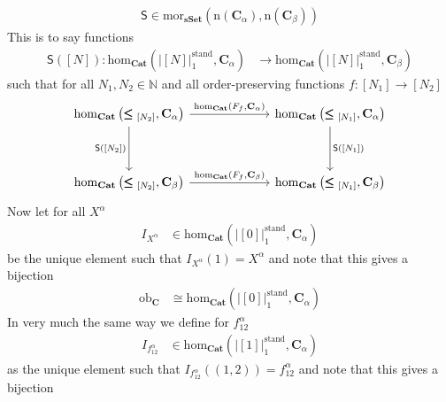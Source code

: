 \begin{prf}
\begin{description}
\begin{align*}
  \mathsf{S}
  \in
  \mathrm{mor}_{\mathbf{sSet}}
  \left(
    \mathrm{n}(\mathbf{C}_{\alpha}),
    \mathrm{n}(\mathbf{C}_{\beta})
  \right)
\end{align*}
This is to say functions
\begin{align*}
  \mathsf{S}([N])
  \colon
  \mathrm{hom}_{\mathbf{Cat}}
  \left(
    \left\vert
      [N]
    \right\vert_{1}^{\textrm{stand}},
    \mathbf{C}_{\alpha}
  \right)
  &\rightarrow
  \mathrm{hom}_{\mathbf{Cat}}
  \left(
    \vert
      [N]
    \vert_{1}^{\textrm{stand}},
    \mathbf{C}_{\beta}
  \right)
\end{align*}
such that for all $N_{1},N_{2} \in \mathbb{N}$ and all order-preserving functions $f \colon [N_{1}] \rightarrow [N_{2}]$
\[
\begin{tikzcd}[row sep=huge, column sep=15ex]
  \mathrm{hom}_{\mathbf{Cat}}
  \left(
    \pmb{\leq}_{[N_{2}]},
    \mathbf{C}_{\alpha}
  \right)
  \arrow{r}{\mathrm{hom}_{\mathbf{Cat}}(F_{f},\mathbf{C}_{\alpha})}
  \arrow[swap]{d}{\mathsf{S}([N_{2}])}
  &
  \mathrm{hom}_{\mathbf{Cat}}
  \left(
    \pmb{\leq}_{[N_{1}]},
    \mathbf{C}_{\alpha}
  \right)
  \arrow{d}{\mathsf{S}([N_{1}])}
  \\
  \mathrm{hom}_{\mathbf{Cat}}
  \left(
    \pmb{\leq}_{[N_{2}]},
    \mathbf{C}_{\beta}
  \right)
  \arrow{r}{\mathrm{hom}_{\mathbf{Cat}}(F_{f},\mathbf{C}_{\beta})}
  &
  \mathrm{hom}_{\mathbf{Cat}}
  \left(
    \pmb{\leq}_{[N_{1}]},
    \mathbf{C}_{\beta}
  \right)
\end{tikzcd}
\]
Now let for all $X^{\alpha}$
\begin{align*}
  I_{X^{\alpha}}
  &\in
  \mathrm{hom}_{\mathbf{Cat}}
  \left(
    \left\vert
      [0]
    \right\vert_{1}^{\textrm{stand}},
    \mathbf{C}_{\alpha}
  \right)
\end{align*}
be the unique element such that $I_{X^{\alpha}}(1) = X^{\alpha}$ and note that this gives a bijection
\begin{align*}
  \mathrm{ob}_{\mathbf{C}}
  &\cong
  \mathrm{hom}_{\mathbf{Cat}}
  \left(
    \left\vert
      [0]
    \right\vert_{1}^{\textrm{stand}},
    \mathbf{C}_{\alpha}
  \right)
\end{align*}
In very much the same way we define for $f_{12}^{\alpha}$
\begin{align*}
  I_{f_{12}^{\alpha}}
  &\in
  \mathrm{hom}_{\mathbf{Cat}}
  \left(
    \left\vert
      [1]
    \right\vert_{1}^{\textrm{stand}},
    \mathbf{C}_{\alpha}
  \right)
\end{align*}
as the unique element such that $I_{f_{12}^{\alpha}}((1,2)) = f_{12}^{\alpha}$ and note that this gives a bijection

\end{description}
\end{prf}

